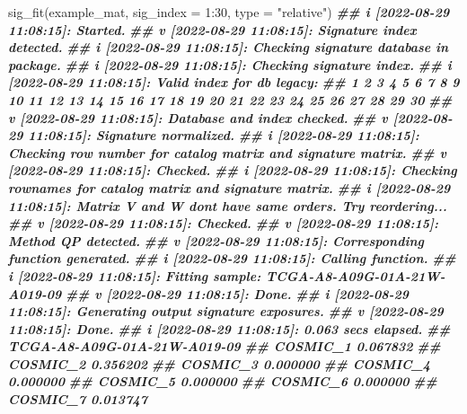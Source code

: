 \documentclass[
  12pt,
  a4paper,
  twoside]{book}
\newenvironment{Shaded}{\begin{snugshade}}{\end{snugshade}}
\newcommand{\AttributeTok}[1]{\textcolor[rgb]{0.77,0.63,0.00}{#1}}
\newcommand{\DecValTok}[1]{\textcolor[rgb]{0.00,0.00,0.81}{#1}}
\newcommand{\DocumentationTok}[1]{\textcolor[rgb]{0.56,0.35,0.01}{\textbf{\textit{#1}}}}
\newcommand{\FunctionTok}[1]{\textcolor[rgb]{0.00,0.00,0.00}{#1}}
\newcommand{\NormalTok}[1]{#1}
\newcommand{\SpecialCharTok}[1]{\textcolor[rgb]{0.00,0.00,0.00}{#1}}
\newcommand{\StringTok}[1]{\textcolor[rgb]{0.31,0.60,0.02}{#1}}
\begin{document}
\begin{Shaded}
\begin{Highlighting}[]
\FunctionTok{sig\_fit}\NormalTok{(example\_mat, }\AttributeTok{sig\_index =} \DecValTok{1}\SpecialCharTok{:}\DecValTok{30}\NormalTok{, }\AttributeTok{type =} \StringTok{"relative"}\NormalTok{)}
\DocumentationTok{\#\# i [2022{-}08{-}29 11:08:15]: Started.}
\DocumentationTok{\#\# v [2022{-}08{-}29 11:08:15]: Signature index detected.}
\DocumentationTok{\#\# i [2022{-}08{-}29 11:08:15]: Checking signature database in package.}
\DocumentationTok{\#\# i [2022{-}08{-}29 11:08:15]: Checking signature index.}
\DocumentationTok{\#\# i [2022{-}08{-}29 11:08:15]: Valid index for db \textquotesingle{}legacy\textquotesingle{}:}
\DocumentationTok{\#\# 1 2 3 4 5 6 7 8 9 10 11 12 13 14 15 16 17 18 19 20 21 22 23 24 25 26 27 28 29 30}
\DocumentationTok{\#\# v [2022{-}08{-}29 11:08:15]: Database and index checked.}
\DocumentationTok{\#\# v [2022{-}08{-}29 11:08:15]: Signature normalized.}
\DocumentationTok{\#\# i [2022{-}08{-}29 11:08:15]: Checking row number for catalog matrix and signature matrix.}
\DocumentationTok{\#\# v [2022{-}08{-}29 11:08:15]: Checked.}
\DocumentationTok{\#\# i [2022{-}08{-}29 11:08:15]: Checking rownames for catalog matrix and signature matrix.}
\DocumentationTok{\#\# i [2022{-}08{-}29 11:08:15]: Matrix V and W don\textquotesingle{}t have same orders. Try reordering...}
\DocumentationTok{\#\# v [2022{-}08{-}29 11:08:15]: Checked.}
\DocumentationTok{\#\# v [2022{-}08{-}29 11:08:15]: Method \textquotesingle{}QP\textquotesingle{} detected.}
\DocumentationTok{\#\# v [2022{-}08{-}29 11:08:15]: Corresponding function generated.}
\DocumentationTok{\#\# i [2022{-}08{-}29 11:08:15]: Calling function.}
\DocumentationTok{\#\# i [2022{-}08{-}29 11:08:15]: Fitting sample: TCGA{-}A8{-}A09G{-}01A{-}21W{-}A019{-}09}
\DocumentationTok{\#\# v [2022{-}08{-}29 11:08:15]: Done.}
\DocumentationTok{\#\# i [2022{-}08{-}29 11:08:15]: Generating output signature exposures.}
\DocumentationTok{\#\# v [2022{-}08{-}29 11:08:15]: Done.}
\DocumentationTok{\#\# i [2022{-}08{-}29 11:08:15]: 0.063 secs elapsed.}
\DocumentationTok{\#\#           TCGA{-}A8{-}A09G{-}01A{-}21W{-}A019{-}09}
\DocumentationTok{\#\# COSMIC\_1                      0.067832}
\DocumentationTok{\#\# COSMIC\_2                      0.356202}
\DocumentationTok{\#\# COSMIC\_3                      0.000000}
\DocumentationTok{\#\# COSMIC\_4                      0.000000}
\DocumentationTok{\#\# COSMIC\_5                      0.000000}
\DocumentationTok{\#\# COSMIC\_6                      0.000000}
\DocumentationTok{\#\# COSMIC\_7                      0.013747}

\end{Highlighting}
\end{Shaded}
\end{document}
